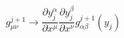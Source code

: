 \begin{equation}
g^{j+1}_{\mu \nu} \rightarrow 
\frac{\partial y_j^{\alpha}}{\partial x^{\mu}} 
\frac{\partial y_j^{\beta}}{\partial x^{\nu}} 
g^{j+1}_{\alpha \beta} ( y_j ) \label{gjsub}
\end{equation} 
